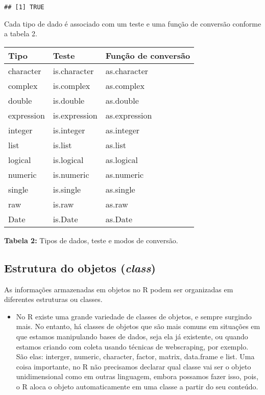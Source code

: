 \documentclass[
]{book}
\providecommand{\tightlist}{%
  \setlength{\itemsep}{0pt}\setlength{\parskip}{0pt}}
\begin{document}
\begin{verbatim}
## [1] TRUE
\end{verbatim}

Cada tipo de dado é associado com um teste e uma função de conversão conforme a tabela 2.

\begin{tabular}{l|l|l}
\hline
Tipo & Teste & Função de conversão\\
\hline
character & is.character & as.character\\
\hline
complex & is.complex & as.complex\\
\hline
double & is.double & as.double\\
\hline
expression & is.expression & as.expression\\
\hline
integer & is.integer & as.integer\\
\hline
list & is.list & as.list\\
\hline
logical & is.logical & as.logical\\
\hline
numeric & is.numeric & as.numeric\\
\hline
single & is.single & as.single\\
\hline
raw & is.raw & as.raw\\
\hline
Date & is.Date & as.Date\\
\hline
\end{tabular}

\textbf{Tabela 2:} Tipos de dados, teste e modos de conversão.

\hypertarget{estrutura-do-objetos-class}{%
\subsection{\texorpdfstring{Estrutura do objetos (\emph{class})}{Estrutura do objetos (class)}}\label{estrutura-do-objetos-class}}

As informações armazenadas em objetos no R podem ser organizadas em diferentes estruturas ou classes.

\begin{itemize}
\tightlist
\item
  No R existe uma grande variedade de classes de objetos, e sempre surgindo mais. No entanto, há classes de objetos que são mais comuns em situações em que estamos manipulando bases de dados, seja ela já existente, ou quando estamos criando com coleta usando técnicas de webscraping, por exemplo. São elas: interger, numeric, character, factor, matrix, data.frame e list. Uma coisa importante, no R não precisamos declarar qual classe vai ser o objeto unidimensional como em outras linguagem, embora possamos fazer isso, pois, o R aloca o objeto automaticamente em uma classe a partir do seu conteúdo. \citet{MeirelesandSilva2018}
\end{itemize}
\end{document}
